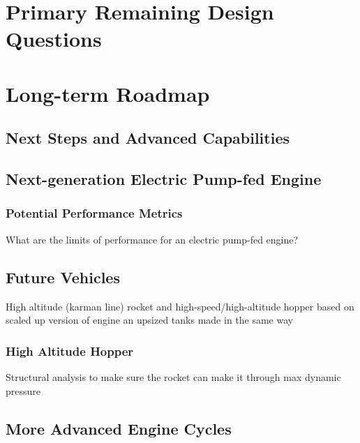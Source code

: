 \documentclass[12pt, letterpaper]{article}
\begin{document}
\section{Primary Remaining Design Questions}

\section{Long-term Roadmap}
\subsection{Next Steps and Advanced Capabilities}
\subsection{Next-generation Electric Pump-fed Engine}
\subsubsection{Potential Performance Metrics}
What are the limits of performance for an electric pump-fed engine?

\subsection{Future Vehicles}
High altitude (karman line) rocket and high-speed/high-altitude hopper based on scaled up version of engine an upsized tanks made in the same way

\subsubsection{High Altitude Hopper}
Structural analysis to make sure the rocket can make it through max dynamic pressure
\subsection{More Advanced Engine Cycles}
\end{document}
